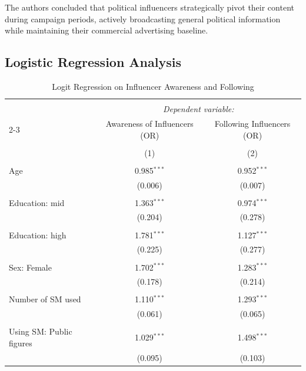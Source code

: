 \documentclass[12pt, a4paper]{article}
\begin{document}
	The authors concluded that political influencers strategically pivot their content during campaign periods, actively broadcasting general political information while maintaining their commercial advertising baseline.
	
	\subsection{Logistic Regression Analysis}

	
	
	\begin{table}[H] \centering 
		\caption{Logit Regression on Influencer Awareness and Following} 
		\label{tab:logit_models} 
		\begin{tabular}{@{\extracolsep{5pt}}lcc} 
			\\[-1.8ex]\hline 
			\hline \\[-1.8ex] 
			& \multicolumn{2}{c}{\textit{Dependent variable:}} \\ 
			\cline{2-3} 
			& Awareness of Influencers (OR) & Following Influencers (OR) \\ 
			\\[-1.8ex] & (1) & (2)\\ 
			\hline \\[-1.8ex] 
			Age & 0.985$^{***}$ & 0.952$^{***}$ \\ 
			& (0.006) & (0.007) \\ 
			& & \\ 
			Education: mid & 1.363$^{***}$ & 0.974$^{***}$ \\ 
			& (0.204) & (0.278) \\ 
			& & \\ 
			Education: high & 1.781$^{***}$ & 1.127$^{***}$ \\ 
			& (0.225) & (0.277) \\ 
			& & \\ 
			Sex: Female & 1.702$^{***}$ & 1.283$^{***}$ \\ 
			& (0.178) & (0.214) \\ 
			& & \\ 
			Number of SM used & 1.110$^{***}$ & 1.293$^{***}$ \\ 
			& (0.061) & (0.065) \\ 
			& & \\ 
			Using SM: Public figures & 1.029$^{***}$ & 1.498$^{***}$ \\ 
			& (0.095) & (0.103) \\ 

\end{tabular}
\end{table}
\end{document}
